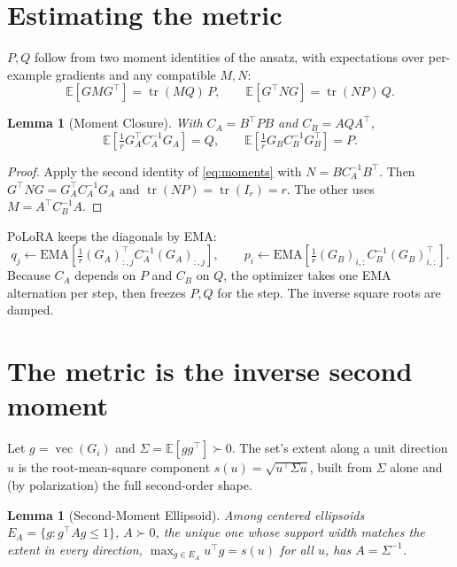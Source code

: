 \documentclass[11pt]{article}
\newcommand{\E}{\mathbb{E}}
\DeclareMathOperator{\tr}{tr}
\DeclareMathOperator{\vecop}{vec}
\newtheorem{lemma}[proposition]{Lemma}
\begin{document}
\section{Estimating the metric}
\label{sec:estimate}

$P,Q$ follow from two moment identities of the ansatz, with expectations over
per-example gradients and any compatible $M,N$:
\begin{equation}
  \E[GMG^\top]=\tr(MQ)\,P,
  \qquad
  \E[G^\top NG]=\tr(NP)\,Q .
  \label{eq:moments}
\end{equation}

\begin{lemma}[Moment Closure]
\label{lem:moment}
With $C_A=B^\top PB$ and $C_B=AQA^\top$,
\begin{equation}
  \E\!\left[\tfrac1r G_A^\top C_A^{-1}G_A\right]=Q,
  \qquad
  \E\!\left[\tfrac1r G_BC_B^{-1}G_B^\top\right]=P .
  \label{eq:closure}
\end{equation}
\end{lemma}

\begin{proof}
Apply the second identity of \eqref{eq:moments} with $N=BC_A^{-1}B^\top$. Then
$G^\top NG=G_A^\top C_A^{-1}G_A$ and $\tr(NP)=\tr(I_r)=r$. The other uses
$M=A^\top C_B^{-1}A$.
\end{proof}

PoLoRA keeps the diagonals by EMA:
\begin{equation}
  q_j\leftarrow\mathrm{EMA}\!\left[\tfrac1r(G_A)_{:,j}^\top C_A^{-1}(G_A)_{:,j}\right],
  \qquad
  p_i\leftarrow\mathrm{EMA}\!\left[\tfrac1r(G_B)_{i,:}C_B^{-1}(G_B)_{i,:}^\top\right].
  \label{eq:ema}
\end{equation}
Because $C_A$ depends on $P$ and $C_B$ on $Q$, the optimizer takes one EMA
alternation per step, then freezes $P,Q$ for the step. The inverse square roots
are damped.

\appendix

\section{The metric is the inverse second moment}
\label{app:metric}

Let $g=\vecop(G_i)$ and $\Sigma=\E[gg^\top]\succ0$. The set's extent along a unit
direction $u$ is the root-mean-square component $s(u)=\sqrt{u^\top\Sigma u}$,
built from $\Sigma$ alone and (by polarization) the full second-order shape.

\begin{lemma}[Second-Moment Ellipsoid]
\label{lem:shape}
Among centered ellipsoids $E_A=\{g:g^\top Ag\le1\}$, $A\succ0$, the unique one
whose support width matches the extent in every direction,
$\max_{g\in E_A}u^\top g=s(u)$ for all $u$, has $A=\Sigma^{-1}$.
\end{lemma}
\end{document}
